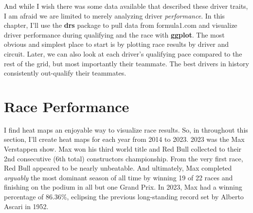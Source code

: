 \documentclass[
]{book}
\begin{document}
And while I wish there was some data available that described these driver traits, I am afraid we are limited to merely analyzing driver \emph{performance}. In this chapter, I'll use the \textbf{drs} package to pull data from formula1.com and visualize driver performance during qualifying and the race with \textbf{ggplot}. The most obvious and simplest place to start is by plotting race results by driver and circuit. Later, we can also look at each driver's qualifying pace compared to the rest of the grid, but most importantly their teammate. The best drivers in history consistently out-qualify their teammates.

\hypertarget{race-performance}{%
\section{Race Performance}\label{race-performance}}

I find heat maps an enjoyable way to visualize race results. So, in throughout this section, I'll create heat maps for each year from 2014 to 2023. 2023 was the Max Verstappen show. Max won his third world title and Red Bull collected to their 2nd consecutive (6th total) constructors championship. From the very first race, Red Bull appeared to be nearly unbeatable. And ultimately, Max completed \emph{arguably} the most dominant season of all time by winning 19 of 22 races and finishing on the podium in all but one Grand Prix. In 2023, Max had a winning percentage of 86.36\%, eclipsing the previous long-standing record set by Alberto Ascari in 1952.
\end{document}
